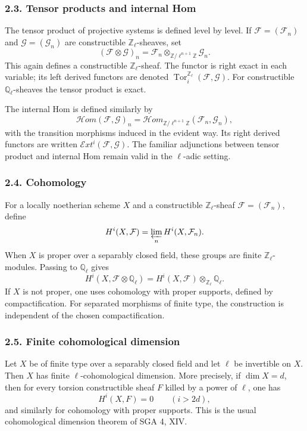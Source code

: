 \documentclass[12pt]{article}
\newcommand{\bZ}{\mathbb Z}
\newcommand{\bQ}{\mathbb Q}
\newcommand{\cF}{\mathcal F}
\newcommand{\cG}{\mathcal G}
\newcommand{\cH}{\mathcal H}
\newcommand{\Tor}{\operatorname{Tor}}
\begin{document}
\subsubsection*{2.3. Tensor products and internal Hom}

The tensor product of projective systems is defined level by level. If
$\cF=(\cF_n)$ and $\cG=(\cG_n)$ are constructible $\bZ_\ell$-sheaves, set
\[
      (\cF\otimes\cG)_n=\cF_n\otimes_{\bZ/\ell^{n+1}\bZ}\cG_n.
\]
This again defines a constructible $\bZ_\ell$-sheaf. The functor is right exact in
each variable; its left derived functors are denoted $\Tor_i^{\bZ_\ell}(\cF,\cG)$.
For constructible $\bQ_\ell$-sheaves the tensor product is exact.

The internal Hom is defined similarly by
\[
      \cH om(\cF,\cG)_n=
      \cH om_{\bZ/\ell^{n+1}\bZ}(\cF_n,\cG_n),
\]
with the transition morphisms induced in the evident way. Its right derived functors
are written $\mathcal Ext^i(\cF,\cG)$. The familiar adjunctions between tensor
product and internal Hom remain valid in the $\ell$-adic setting.

\subsubsection*{2.4. Cohomology}

For a locally noetherian scheme $X$ and a constructible $\bZ_\ell$-sheaf
$\cF=(\cF_n)$, define
\[
      H^i(X,\cF)=\varprojlim_n H^i(X,\cF_n).
\]
When $X$ is proper over a separably closed field, these groups are finite
$\bZ_\ell$-modules. Passing to $\bQ_\ell$ gives
\[
      H^i(X,\cF\otimes\bQ_\ell)
      =H^i(X,\cF)\otimes_{\bZ_\ell}\bQ_\ell.
\]
If $X$ is not proper, one uses cohomology with proper supports, defined by
compactification. For separated morphisms of finite type, the construction is
independent of the chosen compactification.

\subsubsection*{2.5. Finite cohomological dimension}

Let $X$ be of finite type over a separably closed field and let $\ell$ be invertible
on $X$. Then $X$ has finite $\ell$-cohomological dimension. More precisely, if
$\dim X=d$, then for every torsion constructible sheaf $F$ killed by a power of
$\ell$, one has
\[
       H^i(X,F)=0\qquad (i>2d),
\]
and similarly for cohomology with proper supports. This is the usual cohomological
dimension theorem of SGA 4, XIV.
\end{document}
